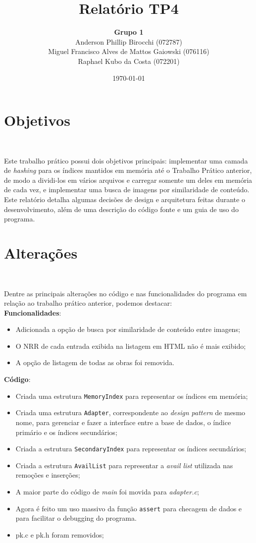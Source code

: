 \documentclass{article}
\title{\textbf{Relatório TP4}}
\author{\textbf{Grupo 1} \\
  Anderson Phillip Birocchi (072787) \\
  Miguel Francisco Alves de Mattos Gaiowski (076116) \\
  Raphael Kubo da Costa (072201)}
\date{\today}
\begin{document}
\maketitle

\section{Objetivos}\

Este trabalho prático possui dois objetivos principais: implementar uma camada de \textit{hashing} para os índices mantidos em memória até o Trabalho Prático anterior, de modo a dividi-los em vários arquivos e carregar somente um deles em memória de cada vez, e implementar uma busca de imagens por similaridade de conteúdo.\\

Este relatório detalha algumas decisões de design e arquitetura feitas durante o desenvolvimento, além de uma descrição do código fonte e um guia de uso do programa.

\section{Alterações}\

Dentre as principais alterações no código e nas funcionalidades do programa em relação ao trabalho prático anterior, podemos destacar:\\

\textbf{Funcionalidades}:
\begin{itemize}
\item Adicionada a opção de busca por similaridade de conteúdo entre imagens;
\item O NRR de cada entrada exibida na listagem em HTML não é mais exibido;
\item A opção de listagem de todas as obras foi removida.
\end{itemize}

\textbf{Código}:
\begin{itemize}
\item Criada uma estrutura \texttt{MemoryIndex} para representar os índices em memória;
\item Criada uma estrutura \texttt{Adapter}, correspondente ao \textit{design pattern} de mesmo nome, para gerenciar e fazer a interface entre a base de dados, o índice primário e os índices secundários;
\item Criada a estrutura \texttt{SecondaryIndex} para representar os índices secundários;
\item Criada a estrutura \texttt{AvailList} para representar a \textit{avail list} utilizada nas remoções e inserções;
\item A maior parte do código de \textit{main} foi movida para \textit{adapter.c};
\item Agora é feito um uso massivo da função \texttt{assert} para checagem de dados e para facilitar o debugging do programa.
\item pk.c e pk.h foram removidos;
\end{itemize}
\end{document}
